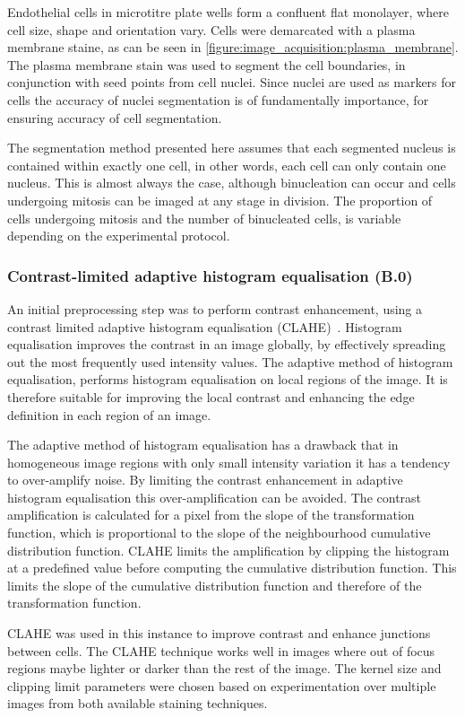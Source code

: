 Endothelial cells in microtitre plate wells form a confluent flat monolayer, where cell size, shape and orientation vary. Cells were demarcated with a plasma membrane staine, as can be seen in \autoref{figure:image_acquisition:plasma_membrane}. The plasma membrane stain was used to segment the cell boundaries, in conjunction with seed points from cell nuclei. Since nuclei are used as markers for cells the accuracy of nuclei segmentation is of fundamentally importance, for ensuring accuracy of cell segmentation.

The segmentation method presented here assumes that each segmented nucleus is contained within exactly one cell, in other words, each cell can only contain one nucleus. This is almost always the case, although binucleation can occur and cells undergoing mitosis can be imaged at any stage in division. The proportion of cells undergoing mitosis and the number of binucleated cells, is variable depending on the experimental protocol.

\subsubsection{Contrast-limited adaptive histogram equalisation (B.0)}
An initial preprocessing step was to perform contrast enhancement, using a contrast limited adaptive histogram equalisation (CLAHE)~\cite{Ketcham1974}. Histogram equalisation improves the contrast in an image globally, by effectively spreading out the most frequently used intensity values. The adaptive method of histogram equalisation, performs histogram equalisation on local regions of the image. It is therefore suitable for improving the local contrast and enhancing the edge definition in each region of an image.

The adaptive method of histogram equalisation has a drawback that in homogeneous image regions with only small intensity variation it has a tendency to over-amplify noise. By limiting the contrast enhancement in adaptive histogram equalisation this over-amplification can be avoided. The contrast amplification is calculated for a pixel from the slope of the transformation function, which is proportional to the slope of the neighbourhood cumulative distribution function. CLAHE limits the amplification by clipping the histogram at a predefined value before computing the cumulative distribution function. This limits the slope of the cumulative distribution function and therefore of the transformation function.

CLAHE was used in this instance to improve contrast and enhance junctions between cells. The CLAHE technique works well in images where out of focus regions maybe lighter or darker than the rest of the image. The kernel size and clipping limit parameters were chosen based on experimentation over multiple images from both available staining techniques.

